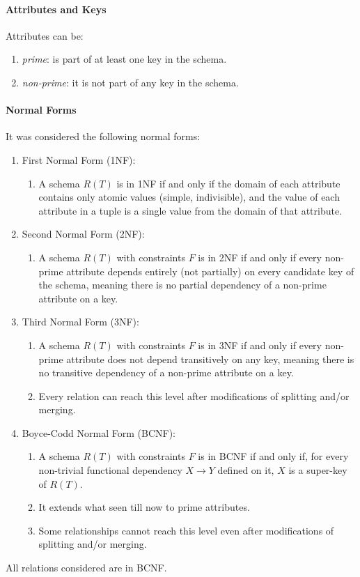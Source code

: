 \documentclass[12pt, a4paper]{report}
\begin{document}
\paragraph{Attributes and Keys}
Attributes can be:
\begin{enumerate}
    \item \textit{prime}: is part of at least one key in the schema.
    \item \textit{non-prime}: it is not part of any key in the schema.
\end{enumerate}

\paragraph{Normal Forms}
It was considered the following normal forms:
\begin{enumerate}
    \item First Normal Form (1NF):
    \begin{enumerate}
        \item A schema $R(T)$ is in 1NF if and only if the domain of each attribute contains only atomic values (simple,
              indivisible), and the value of each attribute in a tuple is a single value from the domain of that attribute.
    \end{enumerate}
    \item Second Normal Form (2NF):
    \begin{enumerate}
        \item A schema $R(T)$ with constraints $F$ is in 2NF if and only if every non-prime attribute depends entirely (not
              partially) on every candidate key of the schema, meaning there is no partial dependency of a non-prime attribute
              on a key.
    \end{enumerate}
    \item Third Normal Form (3NF):
    \begin{enumerate}
        \item A schema $R(T)$ with constraints $F$ is in 3NF if and only if every non-prime attribute does not depend transitively
              on any key, meaning there is no transitive dependency of a non-prime attribute on a key.
        \item Every relation can reach this level after modifications of splitting and/or merging.
    \end{enumerate}
    \item Boyce-Codd Normal Form (BCNF):
    \begin{enumerate}
        \item A schema $R(T)$ with constraints $F$ is in BCNF if and only if, for every non-trivial functional dependency
              $X \rightarrow Y$ defined on it, $X$ is a super-key of $R(T)$.
        \item It extends what seen till now to prime attributes.
        \item Some relationships cannot reach this level even after modifications of splitting and/or merging.
    \end{enumerate}
\end{enumerate}
All relations considered are in BCNF.
\end{document}
